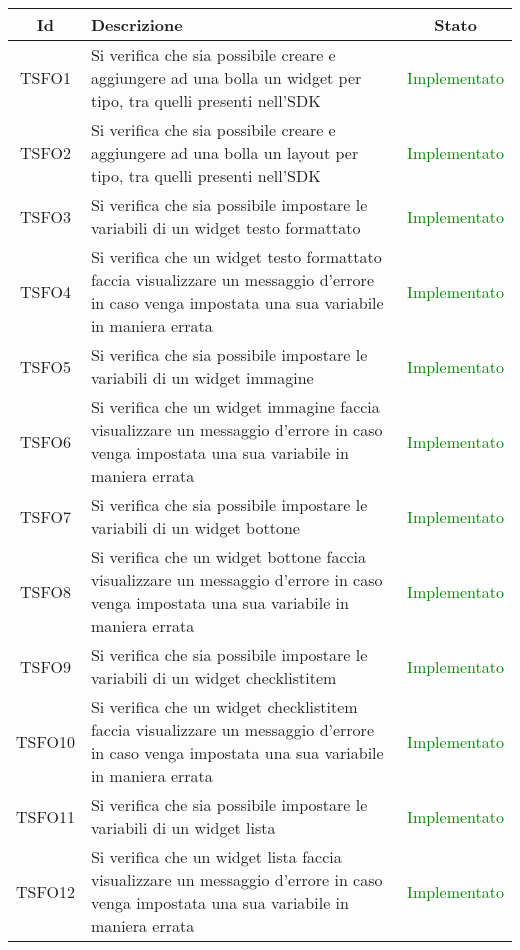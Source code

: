 \begin{center}
	\begin{longtable}{|c|>{\centering}m{10cm}|c|}\hline
		Id & Descrizione & Stato\\ \hline
		TSFO1 & Si verifica che sia possibile creare e aggiungere ad una bolla un widget per tipo, tra quelli presenti nell'SDK & \textcolor{Green}{Implementato}\\ \hline
		TSFO2 & Si verifica che sia possibile creare e aggiungere ad una bolla un layout per tipo, tra quelli presenti nell'SDK & \textcolor{Green}{Implementato}\\ \hline
		TSFO3 & Si verifica che sia possibile impostare le variabili di un widget testo formattato & \textcolor{Green}{Implementato}\\ \hline
		TSFO4 & Si verifica che un widget testo formattato faccia visualizzare un messaggio d'errore in caso venga impostata una sua variabile in maniera errata & \textcolor{Green}{Implementato}\\ \hline
		TSFO5 & Si verifica che sia possibile impostare le variabili di un widget immagine & \textcolor{Green}{Implementato}\\ \hline
		TSFO6 & Si verifica che un widget immagine faccia visualizzare un messaggio d'errore in caso venga impostata una sua variabile in maniera errata & \textcolor{Green}{Implementato}\\ \hline
		TSFO7 & Si verifica che sia possibile impostare le variabili di un widget bottone & \textcolor{Green}{Implementato}\\ \hline
		TSFO8 & Si verifica che un widget bottone faccia visualizzare un messaggio d'errore in caso venga impostata una sua variabile in maniera errata & \textcolor{Green}{Implementato}\\ \hline
		TSFO9 & Si verifica che sia possibile impostare le variabili di un widget checklistitem & \textcolor{Green}{Implementato}\\ \hline
		TSFO10 & Si verifica che un widget checklistitem faccia visualizzare un messaggio d'errore in caso venga impostata una sua variabile in maniera errata & \textcolor{Green}{Implementato}\\ \hline
		TSFO11 & Si verifica che sia possibile impostare le variabili di un widget lista & \textcolor{Green}{Implementato}\\ \hline
		TSFO12 & Si verifica che un widget lista faccia visualizzare un messaggio d'errore in caso venga impostata una sua variabile in maniera errata & \textcolor{Green}{Implementato}\\ \hline

\end{longtable}
\end{center}
